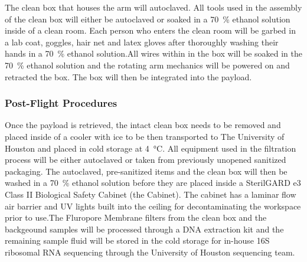 The clean box that houses the arm  will autoclaved. All tools used in the assembly of the clean box will either be autoclaved or soaked in a \SI{70}{\percent} ethanol solution inside of a clean room. Each person who enters the clean room will be garbed in a lab coat, goggles, hair net and latex gloves after thoroughly washing their hands in a \SI{70}{\percent} ethanol solution.All wires within in the box will be soaked in the \SI{70}{\percent} ethanol solution and the rotating arm mechanics will be powered on and retracted the box. The box will then be integrated into the payload. 
\subsubsection{Post-Flight Procedures}

Once the payload is retrieved, the intact clean box needs to be removed and placed inside of a cooler with ice to be then transported to The University of Houston and placed in cold storage at \SI{4}{\celsius}. All equipment used in the filtration process will be either autoclaved or taken from previously unopened sanitized packaging. The autoclaved, pre-sanitized items and the clean box will then be washed in a \SI{70}{\percent} ethanol solution before they are placed inside a SterilGARD e3 Class II Biological Safety Cabinet (the Cabinet). The cabinet has a laminar flow air barrier and UV lights built into the ceiling for decontaminating the workspace prior to use.The Fluropore Membrane filters from the clean box and the backgeound samples will be processed through a DNA extraction kit and the remaining sample fluid will be stored in the cold storage for in-house 16S ribosomal RNA sequencing through the University of Houston sequencing team.  

